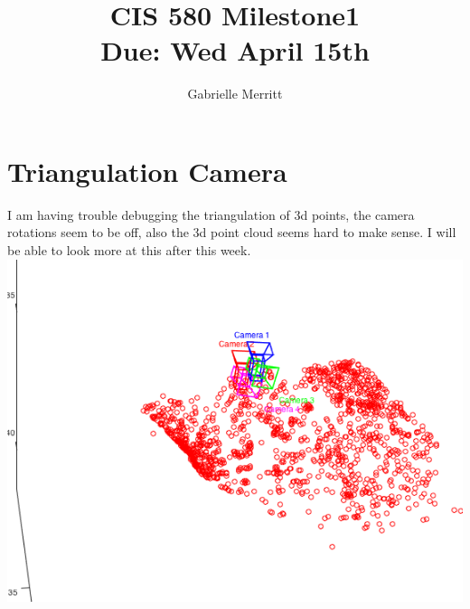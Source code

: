 \documentclass[11pt,english]{article}
\title{CIS 580 Milestone1\\
Due:  Wed April 15th}
\author{Gabrielle Merritt}
\date{}
\begin{document}
\maketitle
\section*{Triangulation Camera}
I am having trouble debugging the triangulation of 3d points, the camera rotations seem to be off, also the 3d point cloud seems hard to make sense. 
I will be able to look  more at this after this week. 
\includegraphics[width = \linewidth]{issues_with_triangulation2}
\end{document}
